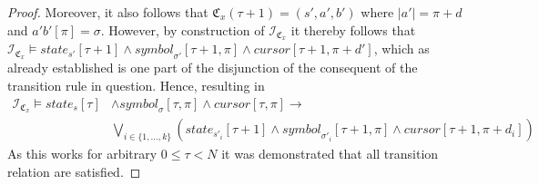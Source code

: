 \documentclass [11pt]{article}
\newcommand{\sym}[3]{\textit{symbol}_{#1}[#2,#3]}
\newcommand{\cursor}[2]{\textit{cursor}[#1,#2]}
\newcommand{\state}[2]{\textit{state}_{#1}[#2]}
\newcommand{\sequ}[1]{\mathfrak{C}_{#1}}
\newcommand{\sequint}[2]{ \mathcal{#1}_{\mathfrak{C}_{#2}}}
\begin{document}
\begin{proof}
Moreover, it also follows that $\sequ{x}(\tau+1)=(s', a',b')$ where $|a'|=\pi +d$ and $a'b'[\pi]=\sigma$. However, by construction of $\sequint{I}{x}$ it thereby follows that 
$\sequint{I}{x} \models {\state{s'}{\tau+1}} \wedge \sym{\sigma'}{\tau+1}{\pi} \wedge {\cursor{\tau+1}{\pi+d'}}$, which as already established is one part of the disjunction of the consequent of the transition rule in question.
Hence, resulting in 
\begin{equation*}
\begin{split}
\sequint{I}{x} \models \state{s}{\tau}& \wedge \sym{\sigma}{\tau}{\pi} \wedge \cursor{\tau}{\pi} \to  \\
&\bigvee_{i \in \{1,\dots ,k\}} ({\state{s'_i}{\tau+1}} \wedge \sym{\sigma'_i}{\tau+1}{\pi} \wedge {\cursor{\tau+1}{\pi+d_i}} ) 
\end{split}
\end{equation*}
As this works for arbitrary $0 \leq \tau <N$ it was demonstrated that all transition relation are satisfied.

\end{proof}
\end{document}
